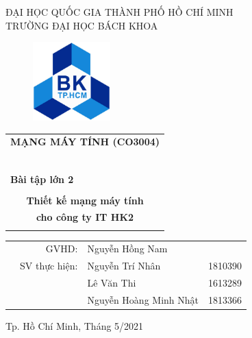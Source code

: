 \documentclass[a4paper]{article}
\begin{document}

\begin{titlepage}
\begin{center}
ĐẠI HỌC QUỐC GIA THÀNH PHỐ HỒ CHÍ MINH \\
TRƯỜNG ĐẠI HỌC BÁCH KHOA \\
\end{center}

\vspace{1cm}

\begin{figure}[H]
\begin{center}
\includegraphics[width=3cm]{Images/LogoBK.jpg}
\end{center}
\end{figure}

\vspace{1cm}


\begin{center}
\begin{tabular}{c}
\multicolumn{1}{c}{\textbf{{\Large MẠNG MÁY TÍNH (CO3004)}}}\\
~~\\
\hline
\\
\multicolumn{1}{l}{\textbf{{\Large Bài tập lớn 2}}}\\
\\
\textbf{{\Huge Thiết kế mạng máy tính}} \\
\textbf{{\Huge cho công ty IT HK2}} \\
\\
\hline
\end{tabular}
\end{center}

\vspace{1.5cm}

\begin{table}[h]
\begin{tabular}{rrll}
\hspace{4 cm} & GVHD: & Nguyễn Hồng Nam\\

& SV thực hiện: & Nguyễn Trí Nhân & 1810390 \\
&& Lê Văn Thi & 1613289\\
&& Nguyễn Hoàng Minh Nhật & 1813366\\

\end{tabular}
\end{table}
\vspace{3cm}
\begin{center}
{\footnotesize Tp. Hồ Chí Minh, Tháng 5/2021}
\end{center}
\end{titlepage}
\end{document}
